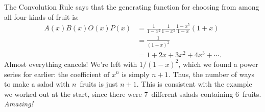 The Convolution Rule says that the generating function for choosing
from among all four kinds of fruit is:
%
\begin{align*}
A(x) B(x) O(x) P(x)
    & = \frac{1}{1-x^2} \frac{1}{1-x^5} \frac{1-x^5}{1-x} (1 + x) \\
    & = \frac{1}{(1-x)^2} \\
    & = 1 + 2x + 3x^2 + 4 x^3 + \cdots.
\end{align*}
%
Almost everything cancels!  We're left with $1 / (1-x)^2$, which we
found a power series for earlier: the coefficient of $x^n$ is simply
$n+1$.  Thus, the number of ways to make a salad with $n$~fruits is
just $n+1$.  This is consistent with the example we worked out at the
start, since there were 7~different salads containing 6~fruits.
\emph{Amazing!}

\begin{problems}
\practiceproblems
{}

\homeworkproblems
{}



\examproblems
{}

\end{problems}

\problemsection

\endinput

